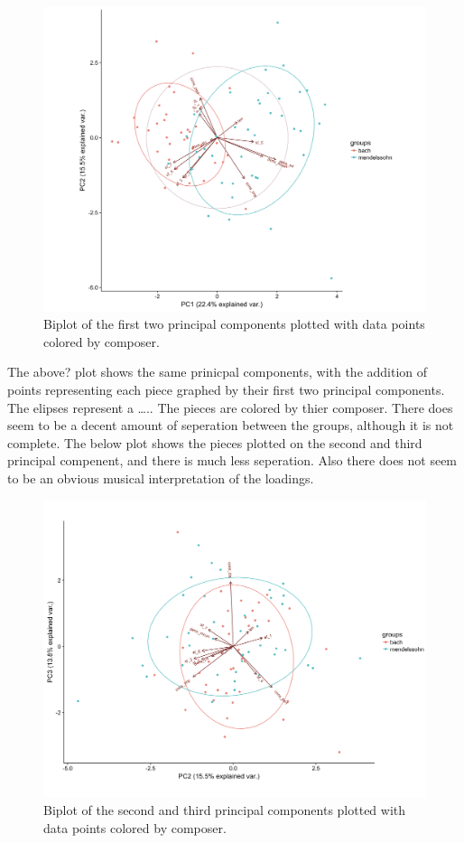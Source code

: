 \documentclass[12pt,twoside]{reedthesis}
\theoremstyle{definition}
\theoremstyle{definition}
\theoremstyle{definition}
\theoremstyle{remark}
\begin{document}
\begin{figure}[h]
\centering
\includegraphics[scale = .3]{images/circle_bf_biplot.png}
\caption{Biplot of the first two principal components plotted with data points colored by composer. }
\label{subd}
\end{figure}
The above? plot shows the same prinicpal components, with the addition
of points representing each piece graphed by their first two principal
components. The elipses represent a \ldots{}.. The pieces are colored by
thier composer. There does seem to be a decent amount of seperation
between the groups, although it is not complete. The below plot shows
the pieces plotted on the second and third principal compenent, and
there is much less seperation. Also there does not seem to be an obvious
musical interpretation of the loadings.
\begin{figure}[h]
\centering
\includegraphics[scale = .3]{images/pca23bm.png}
\caption{Biplot of the second and third principal components plotted with data points colored by composer. }
\label{subd}
\end{figure}
\end{document}

